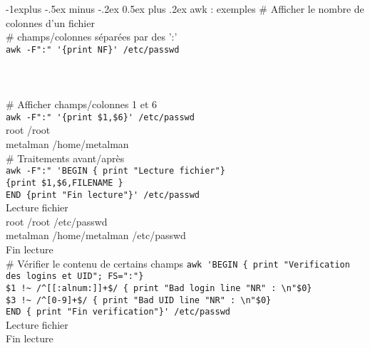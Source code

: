 \documentclass[10pt,landscape]{article}
\makeatletter
\renewcommand{\subsection}{\@startsection{subsection}{2}{0mm}%
                                {-1explus -.5ex minus -.2ex}%
                                {0.5ex plus .2ex}%
                                {\normalfont\normalsize\bfseries}}
\makeatother
\begin{document}
\begin{multicols}{3}
\subsection{awk : exemples}
\# Afficher le nombre de colonnes d'un fichier\\
\# champs/colonnes séparées par des ':'\\
\verb!awk -F":" '{print NF}' /etc/passwd!\\
\\
\\
\\

\# Afficher champs/colonnes 1 et 6\\
\verb!awk -F":" '{print $1,$6}' /etc/passwd!\\
\textrightarrow root /root\\
\textrightarrow metalman /home/metalman\\

\# Traitements avant/après\\
\verb!awk -F":" 'BEGIN { print "Lecture fichier"}!\\
\verb!{print $1,$6,FILENAME }!\\
\verb!END {print "Fin lecture"}' /etc/passwd!\\
\textrightarrow Lecture fichier\\
\textrightarrow root /root /etc/passwd\\
\textrightarrow metalman /home/metalman /etc/passwd\\
\textrightarrow Fin lecture\\

\# Vérifier le contenu de certains champs
\verb!awk 'BEGIN { print "Verification des logins et UID"; FS=":"}!\\
\verb|$1 !~ /^[[:alnum:]]+$/ { print "Bad login line "NR" : \n"$0}|\\
\verb|$3 !~ /^[0-9]+$/ { print "Bad UID line "NR" : \n"$0}|\\
\verb|END { print "Fin verification"}' /etc/passwd|\\
\textrightarrow Lecture fichier\\
\textrightarrow Fin lecture\\


\end{multicols}
\end{document}
